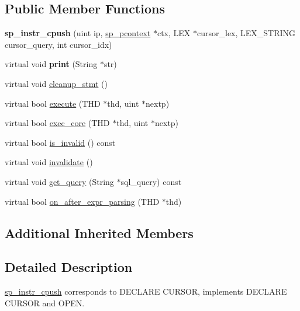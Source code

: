 \subsection*{Public Member Functions}
\begin{DoxyCompactItemize}
\item 
\mbox{\label{classsp__instr__cpush_a52646784258a620777fb19bd6aea4504}} 
{\bfseries sp\+\_\+instr\+\_\+cpush} (uint ip, \mbox{\hyperlink{classsp__pcontext}{sp\+\_\+pcontext}} $\ast$ctx, L\+EX $\ast$cursor\+\_\+lex, L\+E\+X\+\_\+\+S\+T\+R\+I\+NG cursor\+\_\+query, int cursor\+\_\+idx)
\item 
\mbox{\label{classsp__instr__cpush_ab4b7510434cf4bc6006ea2862d370be9}} 
virtual void {\bfseries print} (String $\ast$str)
\item 
virtual void \mbox{\hyperlink{classsp__instr__cpush_aaf0ea89ac73cfcaff29ac4e3b9c97f7e}{cleanup\+\_\+stmt}} ()
\item 
virtual bool \mbox{\hyperlink{classsp__instr__cpush_a7d372bf13da26255682db5ea8da893b0}{execute}} (T\+HD $\ast$thd, uint $\ast$nextp)
\item 
virtual bool \mbox{\hyperlink{classsp__instr__cpush_a29936e62ed32e5db6d5a3fdd624fe969}{exec\+\_\+core}} (T\+HD $\ast$thd, uint $\ast$nextp)
\item 
virtual bool \mbox{\hyperlink{classsp__instr__cpush_a05c39644e6c5fd40fd72123b9d7d025d}{is\+\_\+invalid}} () const
\item 
virtual void \mbox{\hyperlink{classsp__instr__cpush_a0bbf836e06e7be8c7f1fbcfba702d43c}{invalidate}} ()
\item 
virtual void \mbox{\hyperlink{classsp__instr__cpush_acdfc630a526f268fa2b983fe55fc0982}{get\+\_\+query}} (String $\ast$sql\+\_\+query) const
\item 
virtual bool \mbox{\hyperlink{classsp__instr__cpush_a5679b6d149a1941a84bc41ddc42848d6}{on\+\_\+after\+\_\+expr\+\_\+parsing}} (T\+HD $\ast$thd)
\end{DoxyCompactItemize}
\subsection*{Additional Inherited Members}


\subsection{Detailed Description}
\mbox{\hyperlink{classsp__instr__cpush}{sp\+\_\+instr\+\_\+cpush}} corresponds to D\+E\+C\+L\+A\+RE C\+U\+R\+S\+OR, implements D\+E\+C\+L\+A\+RE C\+U\+R\+S\+OR and O\+P\+EN.

